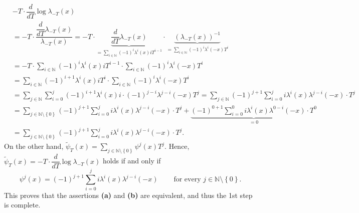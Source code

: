 \documentclass[numbers=enddot,12pt,final,onecolumn,notitlepage]{scrartcl}%
\begin{document}
\begin{align*}
&  -T\cdot\dfrac{d}{dT}\log\lambda_{-T}\left(  x\right) \\
&  =-T\cdot\dfrac{\dfrac{d}{dT}\lambda_{-T}\left(  x\right)  }{\lambda
_{-T}\left(  x\right)  }=-T\cdot\underbrace{\dfrac{d}{dT}\lambda_{-T}\left(
x\right)  }_{=\sum\limits_{i\in\mathbb{N}}\left(  -1\right)  ^{i}\lambda
^{i}\left(  x\right)  iT^{i-1}}\cdot\underbrace{\left(  \lambda_{-T}\left(
x\right)  \right)  ^{-1}}_{=\sum\limits_{i\in\mathbb{N}}\left(  -1\right)
^{i}\lambda^{i}\left(  -x\right)  T^{i}}\\
&  =-T\cdot\sum\limits_{i\in\mathbb{N}}\left(  -1\right)  ^{i}\lambda
^{i}\left(  x\right)  iT^{i-1}\cdot\sum\limits_{i\in\mathbb{N}}\left(
-1\right)  ^{i}\lambda^{i}\left(  -x\right)  T^{i}\\
&  =\sum\limits_{i\in\mathbb{N}}\left(  -1\right)  ^{i+1}\lambda^{i}\left(
x\right)  iT^{i}\cdot\sum\limits_{i\in\mathbb{N}}\left(  -1\right)
^{i}\lambda^{i}\left(  -x\right)  T^{i}\\
&  =\sum_{j\in\mathbb{N}}\sum_{i=0}^{j}\left(  -1\right)  ^{i+1}\lambda
^{i}\left(  x\right)  i\cdot\left(  -1\right)  ^{j-i}\lambda^{j-i}\left(
-x\right)  T^{j}=\sum_{j\in\mathbb{N}}\left(  -1\right)  ^{j+1}\sum_{i=0}%
^{j}i\lambda^{i}\left(  x\right)  \lambda^{j-i}\left(  -x\right)  \cdot
T^{j}\\
&  =\sum_{j\in\mathbb{N}\setminus\left\{  0\right\}  }\left(  -1\right)
^{j+1}\sum_{i=0}^{j}i\lambda^{i}\left(  x\right)  \lambda^{j-i}\left(
-x\right)  \cdot T^{j}+\underbrace{\left(  -1\right)  ^{0+1}\sum_{i=0}%
^{0}i\lambda^{i}\left(  x\right)  \lambda^{0-i}\left(  -x\right)  \cdot T^{0}%
}_{=0}\\
&  =\sum_{j\in\mathbb{N}\setminus\left\{  0\right\}  }\left(  -1\right)
^{j+1}\sum_{i=0}^{j}i\lambda^{i}\left(  x\right)  \lambda^{j-i}\left(
-x\right)  \cdot T^{j}.
\end{align*}
On the other hand, $\widetilde{\psi}_{T}\left(  x\right)  =\sum\limits_{j\in
\mathbb{N}\setminus\left\{  0\right\}  }\psi^{j}\left(  x\right)  T^{j}$.
Hence, $\widetilde{\psi}_{T}\left(  x\right)  =-T\cdot\dfrac{d}{dT}\log
\lambda_{-T}\left(  x\right)  $ holds if and only if%
\[
\psi^{j}\left(  x\right)  =\left(  -1\right)  ^{j+1}\sum_{i=0}^{j}i\lambda
^{i}\left(  x\right)  \lambda^{j-i}\left(  -x\right)
\ \ \ \ \ \ \ \ \ \ \text{for every }j\in\mathbb{N}\setminus\left\{
0\right\}  \text{.}%
\]
This proves that the assertions \textbf{(a)} and \textbf{(b)} are equivalent,
and thus the 1st step is complete.
\end{document}
